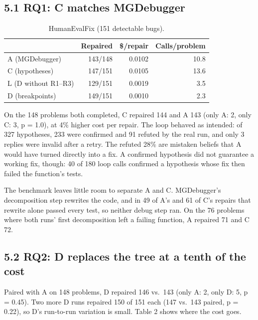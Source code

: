 \documentclass[
  10pt,
  twocolumn]{article}
\begin{document}
\hypertarget{rq1-c-matches-mgdebugger}{%
\subsection{5.1 RQ1: C matches
MGDebugger}\label{rq1-c-matches-mgdebugger}}

\begin{table}[h]\small\centering
\caption{HumanEvalFix (151 detectable bugs).}
\begin{tabular}{lrrr}\toprule
 & Repaired & \$/repair & Calls/problem \\ \midrule
A (MGDebugger) & 143/148 & 0.0102 & 10.8 \\
C (hypotheses) & 147/151 & 0.0105 & 13.6 \\
L (D without R1--R3) & 129/151 & 0.0019 & 3.5 \\
D (breakpoints) & 149/151 & 0.0010 & 2.3 \\ \bottomrule
\end{tabular}\end{table}

On the 148 problems both completed, C repaired 144 and A 143 (only A: 2,
only C: 3, p = 1.0), at 4\% higher cost per repair. The loop behaved as
intended: of 327 hypotheses, 233 were confirmed and 91 refuted by the
real run, and only 3 replies were invalid after a retry. The refuted
28\% are mistaken beliefs that A would have turned directly into a fix.
A confirmed hypothesis did not guarantee a working fix, though: 40 of
180 loop calls confirmed a hypothesis whose fix then failed the
function's tests.

The benchmark leaves little room to separate A and C. MGDebugger's
decomposition step rewrites the code, and in 49 of A's and 61 of C's
repairs that rewrite alone passed every test, so neither debug step ran.
On the 76 problems where both runs' first decomposition left a failing
function, A repaired 71 and C 72.

\hypertarget{rq2-d-replaces-the-tree-at-a-tenth-of-the-cost}{%
\subsection{5.2 RQ2: D replaces the tree at a tenth of the
cost}\label{rq2-d-replaces-the-tree-at-a-tenth-of-the-cost}}

Paired with A on 148 problems, D repaired 146 vs.~143 (only A: 2, only
D: 5, p = 0.45). Two more D runs repaired 150 of 151 each (147 vs.~143
paired, p = 0.22), so D's run-to-run variation is small. Table 2 shows
where the cost goes.
\end{document}
